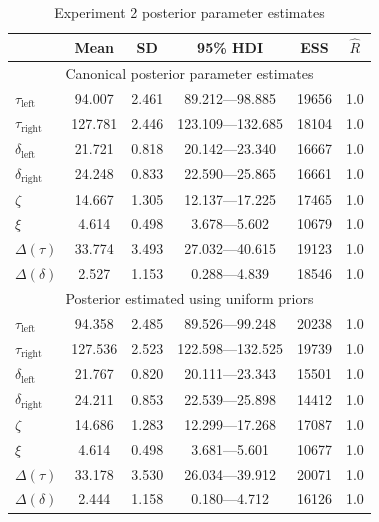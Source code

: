 \documentclass[doc,biblatex]{apa7}
\begin{document}
\clearpage

\begin{table}
\begin{center}
\begin{threeparttable}
\caption{Experiment 2 posterior parameter estimates}
\footnotesize
\begin{tabular}{lccccc}
\toprule
{} &   Mean &     SD &  95\% HDI &  ESS &  $\hat{R}$ \\
\midrule
\multicolumn{6}{c}{Canonical posterior parameter estimates} \\
\midrule
$\tau_\mathrm{left}$  &   94.007 &  2.461 &    89.212---98.885 &   19656 &    1.0 \\
$\tau_\mathrm{right}$ &  127.781 &  2.446 &   123.109---132.685 &   18104 &    1.0 \\
$\delta_\mathrm{left}$  &   21.721 &  0.818 &    20.142---23.340 &   16667 &    1.0 \\
$\delta_\mathrm{right}$ &   24.248 &  0.833 &    22.590---25.865 &   16661 &    1.0 \\
$\zeta$        &   14.667 &  1.305 &    12.137---17.225 &   17465 &    1.0 \\
$\xi$        &    4.614 &  0.498 &     3.678---5.602 &   10679 &    1.0 \\
$\Delta(\tau)$     &   33.774 &  3.493 &    27.032---40.615 &   19123 &    1.0 \\
$\Delta(\delta)$     &    2.527 &  1.153 &     0.288---4.839 &   18546 &    1.0 \\
\midrule
\multicolumn{6}{c}{Posterior estimated using uniform priors} \\
\midrule
$\tau_\mathrm{left}$  &   94.358 &  2.485 &    89.526---99.248 &   20238 &    1.0 \\
$\tau_\mathrm{right}$ &  127.536 &  2.523 &   122.598---132.525 &   19739 &    1.0 \\
$\delta_\mathrm{left}$  &   21.767 &  0.820 &    20.111---23.343 &   15501 &    1.0 \\
$\delta_\mathrm{right}$ &   24.211 &  0.853 &    22.539---25.898 &   14412 &    1.0 \\
$\zeta$        &   14.686 &  1.283 &    12.299---17.268 &   17087 &    1.0 \\
$\xi$        &    4.614 &  0.498 &     3.681---5.601 &   10677 &    1.0 \\
$\Delta(\tau)$     &   33.178 &  3.530 &    26.034---39.912 &   20071 &    1.0 \\
$\Delta(\delta)$     &    2.444 &  1.158 &     0.180---4.712 &   16126 &    1.0 \\

\end{tabular}
\end{threeparttable}
\end{center}
\end{table}
\end{document}
